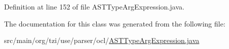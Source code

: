 Definition at line 152 of file A\-S\-T\-Type\-Arg\-Expression.\-java.



The documentation for this class was generated from the following file\-:\begin{DoxyCompactItemize}
\item 
src/main/org/tzi/use/parser/ocl/\hyperlink{_a_s_t_type_arg_expression_8java}{A\-S\-T\-Type\-Arg\-Expression.\-java}\end{DoxyCompactItemize}
